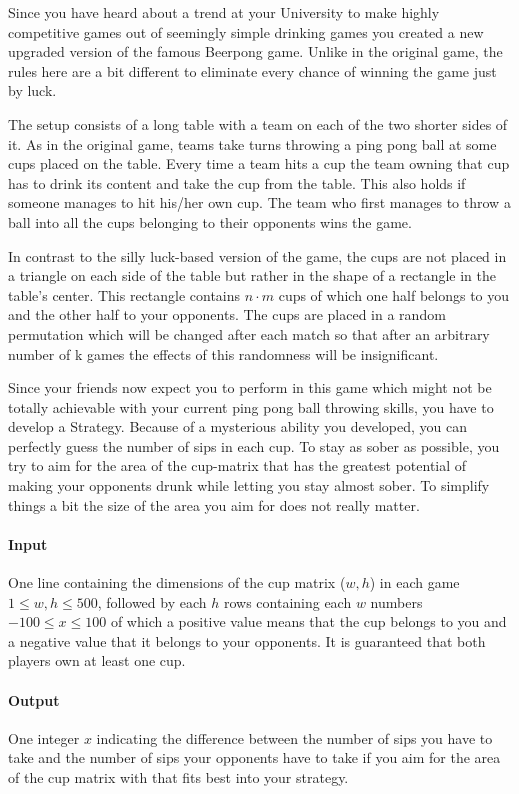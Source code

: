 



\makeheader

Since you have heard about a trend at your University to make highly competitive games out of seemingly simple drinking games you created a new upgraded version of the famous Beerpong game. Unlike in the original game, the rules here are a bit different to eliminate every chance of winning the game just by luck. 

The setup consists of a long table with a team on each of the two shorter sides of it. As in the original game, teams take turns throwing a ping pong ball at some cups placed on the table. Every time a team hits a cup the team owning that cup has to drink its content and take the cup from the table. This also holds if someone manages to hit his/her own cup. The team who first manages to throw a ball into all the cups belonging to their opponents wins the game. 

In contrast to the silly luck-based version of the game, the cups are not placed in a triangle on each side of the table but rather in the shape of a rectangle in the table's center. This rectangle contains  $n \cdot m$ cups of which one half belongs to you and the other half to your opponents. The cups are placed in a random permutation which will be changed after each match so that after an arbitrary number of k games the effects of this randomness will be insignificant. 

Since your friends now expect you to perform in this game which might not be totally achievable with your current ping pong ball throwing skills, you have to develop a Strategy. Because of a mysterious ability you developed, you can perfectly guess the number of sips in each cup. To stay as sober as possible, you try to aim for the area of the cup-matrix that has the greatest potential of making your opponents drunk while letting you stay almost sober. To simplify things a bit the size of the area you aim for does not really matter.


\paragraph*{Input}
One line containing the dimensions of the cup matrix ($w,h$) in each game $1 \leq w,h \leq 500$, followed by each $h$ rows containing each $w$ numbers $-100 \leq x \leq 100$ of which a positive value means that the cup belongs to you and a negative value that it belongs to your opponents.
It is guaranteed that both players own at least one cup.

\paragraph*{Output}
One integer $x$ indicating the difference between the number of sips you have to take and the number of sips your opponents have to take if you aim for the area of the cup matrix with that fits best into your strategy.

\begin{samples}
\end{samples}


